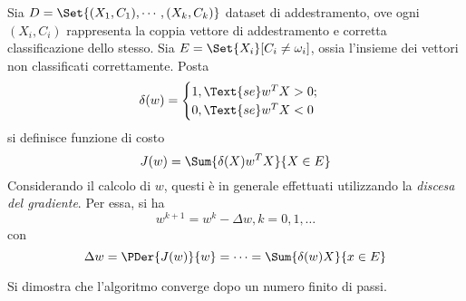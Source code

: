 \documentclass{subfiles}
\begin{document}
Sia \(D = \Set{(X_{1}, C_{1}), \cdots, (X_{k}, C_{k})}\) dataset di addestramento,
ove ogni \((X_{i}, C_{i})\) rappresenta la coppia vettore di addestramento e corretta classificazione dello stesso.
Sia \(E = \Set{X_{i}}[C_{i} \ne \omega_{i}]\), ossia l'insieme dei vettori non classificati correttamente.
Posta
\[
    \delta(w) = \begin{cases}
        1, \Text{se} w^{T}X > 0; \\
        0, \Text{se} w^{T}X < 0
    \end{cases}\]
si definisce funzione di costo
\[
    J(w) = \Sum{\delta(X) w^{T}X}{X \in E}
\]
Considerando il calcolo di \(w\), questi è in generale effettuati utilizzando la \emph{discesa del gradiente}.
Per essa, si ha
\[
    w^{k + 1} = w^{k} - \Delta w, k = 0, 1, \ldots
\]
con
\[
    \Delta w = \PDer{J(w)}{w} = \cdots = \Sum{\delta(w)X}{x \in E}
\]

Si dimostra che l'algoritmo converge dopo un numero finito di passi.
\end{document}

